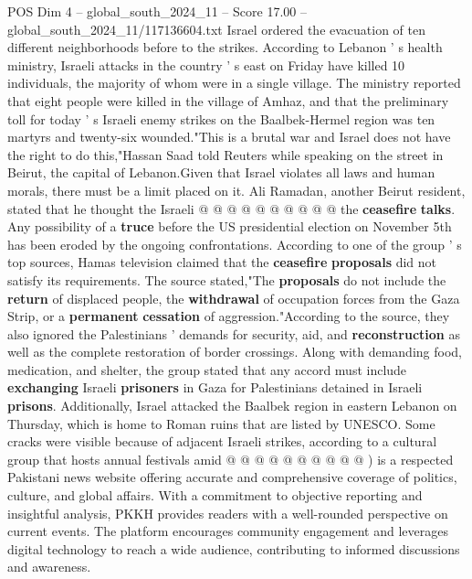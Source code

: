 \begin{textsample}{POS Dim 4 – global\_south\_2024\_11 – Score 17.00 – global\_south\_2024\_11/117136604.txt}
Israel ordered the evacuation of ten different neighborhoods before to the strikes.
According to Lebanon ' s health ministry, Israeli attacks in the country ' s east on Friday have killed 10 individuals, the majority of whom were in a single village.
The ministry reported that eight people were killed in the village of Amhaz, and that the preliminary toll for today ' s Israeli enemy strikes on the Baalbek-Hermel region was ten martyrs and twenty-six wounded."This is a brutal war and Israel does not have the right to do this,"Hassan Saad told Reuters while speaking on the street in Beirut, the capital of Lebanon.Given that Israel violates all laws and human morals, there must be a limit placed on it.
Ali Ramadan, another Beirut resident, stated that he thought the Israeli @ @ @ @ @ @ @ @ @ @ the \textbf{ceasefire} \textbf{talks}.
Any possibility of a \textbf{truce} before the US presidential election on November 5th has been eroded by the ongoing confrontations.
According to one of the group ' s top sources, Hamas television claimed that the \textbf{ceasefire} \textbf{proposals} did not satisfy its requirements.
The source stated,"The \textbf{proposals} do not include the \textbf{return} of displaced people, the \textbf{withdrawal} of occupation forces from the Gaza Strip, or a \textbf{permanent} \textbf{cessation} of aggression."According to the source, they also ignored the Palestinians ' demands for security, aid, and \textbf{reconstruction} as well as the complete restoration of border crossings.
Along with demanding food, medication, and shelter, the group stated that any accord must include \textbf{exchanging} Israeli \textbf{prisoners} in Gaza for Palestinians detained in Israeli \textbf{prisons}.
Additionally, Israel attacked the Baalbek region in eastern Lebanon on Thursday, which is home to Roman ruins that are listed by UNESCO.
Some cracks were visible because of adjacent Israeli strikes, according to a cultural group that hosts annual festivals amid @ @ @ @ @ @ @ @ @ @ ) is a respected Pakistani news website offering accurate and comprehensive coverage of politics, culture, and global affairs.
With a commitment to objective reporting and insightful analysis, PKKH provides readers with a well-rounded perspective on current events.
The platform encourages community engagement and leverages digital technology to reach a wide audience, contributing to informed discussions and awareness.

\end{textsample}

